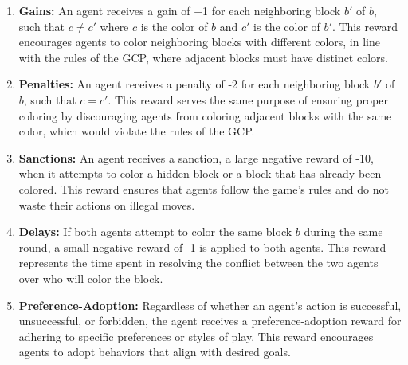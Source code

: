         \begin{enumerate}
            \item \textbf{Gains:} An agent receives a gain of +1 for each neighboring block $b'$ of $b$, such that $c \neq c'$ where $c$ is the color of $b$ and $c'$ is the color of $b'$. This reward encourages agents to color neighboring blocks with different colors, in line with the rules of the GCP, where adjacent blocks must have distinct colors.
            
            \item \textbf{Penalties:} An agent receives a penalty of -2 for each neighboring block $b'$ of $b$, such that $c = c'$. This reward serves the same purpose of ensuring proper coloring by discouraging agents from coloring adjacent blocks with the same color, which would violate the rules of the GCP.
            
            \item \textbf{Sanctions:} An agent receives a sanction, a large negative reward of -10, when it attempts to color a hidden block or a block that has already been colored. This reward ensures that agents follow the game’s rules and do not waste their actions on illegal moves.
            
            \item \textbf{Delays:} If both agents attempt to color the same block $b$ during the same round, a small negative reward of -1 is applied to both agents. This reward represents the time spent in resolving the conflict between the two agents over who will color the block.
            
            \item \textbf{Preference-Adoption:} Regardless of whether an agent’s action is successful, unsuccessful, or forbidden, the agent receives a preference-adoption reward for adhering to specific preferences or styles of play. This reward encourages agents to adopt behaviors that align with desired goals.
        \end{enumerate}